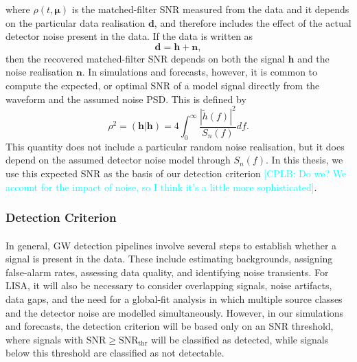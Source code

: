 \documentclass[a4paper,12pt]{article}
\newcommand{\cplb}[1]{\textcolor{cyan}{[CPLB: #1]}}
\begin{document}
where $\rho(t,\boldsymbol{\mu})$ is the matched-filter SNR measured from the data and it depends on the particular data realisation $\mathbf{d}$, and therefore includes the effect of the actual detector noise present in the data. If the data is written as
\begin{equation}
\mathbf{d}=\mathbf{h}+\mathbf{n},
\label{eq:data_signal_noise}
\end{equation}
then the recovered matched-filter SNR depends on both the signal $\mathbf{h}$ and the noise realisation $\mathbf{n}$.
In simulations and forecasts, however, it is common to compute the expected, or optimal SNR of a model signal directly from the waveform and the assumed noise PSD\cite{cutler1994gravitational}. This is defined by
\begin{equation}
\rho^{2} = (\mathbf{h}|\mathbf{h})
=4\int_{0}^{\infty}\frac{|\tilde{h}(f)|^{2}}{S_n(f)}df.
\label{eq:optsnr}
\end{equation}
This quantity does not include a particular random noise realisation, but it does depend on the assumed detector noise model through $S_{n}(f)$. 
In this thesis, we use this expected SNR as the basis of our detection criterion \cplb{Do we? We account for the impact of noise, so I think it's a little more sophisticated}.

\subsubsection{Detection Criterion}
\label{DetectionCrit}

\paragraph{}
In general, GW detection pipelines involve several steps to establish whether a signal is present in the data. These include estimating backgrounds, assigning false-alarm rates, assessing data quality, and identifying noise transients\cite{abbott2020guide}. For LISA, it will also be necessary to consider overlapping signals, noise artifacts, data gaps\cite{baghi2019gravitational}, and the need for a global-fit analysis in which multiple source classes and the detector noise are modelled simultaneously. However, in our simulations and forecasts, the detection criterion will be based only on an SNR threshold, where signals with $\mathrm{SNR}\geq\mathrm{SNR}_{\mathrm{thr}}$ will be classified as detected, while signals below this threshold are classified as not detectable.
\end{document}
